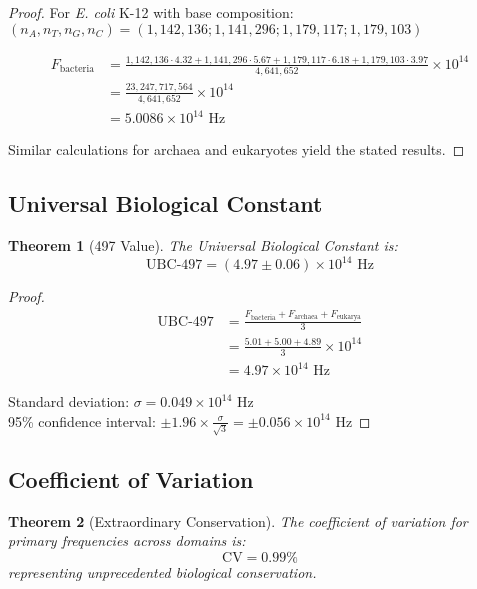 \documentclass[12pt]{article}
\newtheorem{theorem}{Theorem}
\newcommand{\UBC}[1]{\text{UBC-}#1}
\newcommand{\genome}[1]{\textit{#1}}
\newcommand{\CV}{\text{CV}}
\begin{document}
\begin{proof}
For \genome{E. coli} K-12 with base composition:
$(n_A, n_T, n_G, n_C) = (1,142,136; 1,141,296; 1,179,117; 1,179,103)$

\begin{align}
F_{\text{bacteria}} &= \frac{1,142,136 \cdot 4.32 + 1,141,296 \cdot 5.67 + 1,179,117 \cdot 6.18 + 1,179,103 \cdot 3.97}{4,641,652} \times 10^{14} \\
&= \frac{23,247,717,564}{4,641,652} \times 10^{14} \\
&= 5.0086 \times 10^{14} \text{ Hz}
\end{align}

Similar calculations for archaea and eukaryotes yield the stated results.
\end{proof}

\subsection{Universal Biological Constant}

\begin{theorem}[\UBC{497} Value]
The Universal Biological Constant is:
\begin{equation}
\UBC{497} = (4.97 \pm 0.06) \times 10^{14} \text{ Hz}
\end{equation}
\end{theorem}

\begin{proof}
\begin{align}
\UBC{497} &= \frac{F_{\text{bacteria}} + F_{\text{archaea}} + F_{\text{eukarya}}}{3} \\
&= \frac{5.01 + 5.00 + 4.89}{3} \times 10^{14} \\
&= 4.97 \times 10^{14} \text{ Hz}
\end{align}

Standard deviation: $\sigma = 0.049 \times 10^{14}$ Hz \\
95\% confidence interval: $\pm 1.96 \times \frac{\sigma}{\sqrt{3}} = \pm 0.056 \times 10^{14}$ Hz
\end{proof}

\subsection{Coefficient of Variation}

\begin{theorem}[Extraordinary Conservation]
The coefficient of variation for primary frequencies across domains is:
\begin{equation}
\CV = 0.99\%
\end{equation}
representing unprecedented biological conservation.
\end{theorem}
\end{document}
